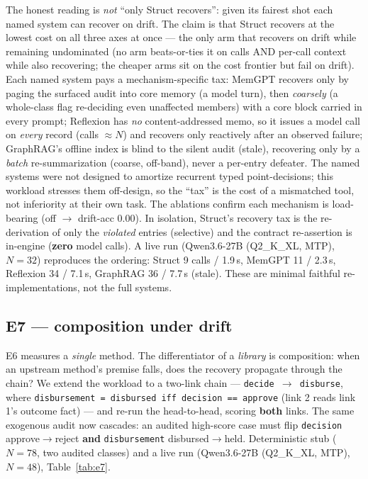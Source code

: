 \documentclass[11pt]{article}
\begin{document}
The honest reading is \emph{not} ``only Struct recovers'': given its fairest shot each named system can recover on
drift. The claim is that Struct recovers at the lowest cost on all three axes at once --- the only arm that
recovers on drift while remaining undominated (no arm beats-or-ties it on calls AND per-call context while also
recovering; the cheaper arms sit on the cost frontier but fail on drift). Each named system pays a
mechanism-specific tax: MemGPT recovers only by paging the surfaced audit
into core memory (a model turn), then \emph{coarsely} (a whole-class flag re-deciding even unaffected members) with
a core block carried in every prompt; Reflexion has \emph{no} content-addressed memo, so it issues a model call on
\emph{every} record (calls $\approx N$) and recovers only reactively after an observed failure; GraphRAG's offline
index is blind to the silent audit (stale), recovering only by a \emph{batch} re-summarization (coarse, off-band),
never a per-entry defeater. The named systems were not designed to amortize recurrent typed point-decisions; this
workload stresses them off-design, so the ``tax'' is the cost of a mismatched tool, not inferiority at their own
task. The ablations confirm each mechanism is load-bearing (off $\to$ drift-acc 0.00). In
isolation, Struct's recovery tax is the re-derivation of only the \emph{violated} entries (selective) and the
contract re-assertion is in-engine (\textbf{zero} model calls). A live run (Qwen3.6-27B (Q2\_K\_XL, MTP), $N=32$)
reproduces the ordering: Struct 9 calls / 1.9\,s, MemGPT 11 / 2.3\,s, Reflexion 34 / 7.1\,s, GraphRAG 36 / 7.7\,s
(stale). These are minimal faithful re-implementations, not the full systems.

\subsection{E7 --- composition under drift}
E6 measures a \emph{single} method. The differentiator of a \emph{library} is composition: when an upstream
method's premise falls, does the recovery propagate through the chain? We extend the workload to a two-link chain
--- \texttt{decide $\to$ disburse}, where \texttt{disbursement = disbursed iff decision == approve} (link 2 reads
link 1's outcome fact) --- and re-run the head-to-head, scoring \textbf{both} links. The same exogenous audit now
cascades: an audited high-score case must flip \texttt{decision} approve$\to$reject \textbf{and}
\texttt{disbursement} disbursed$\to$held. Deterministic stub ($N{=}78$, two audited classes) and a live run
(Qwen3.6-27B (Q2\_K\_XL, MTP), $N{=}48$), Table~\ref{tab:e7}.
\end{document}
